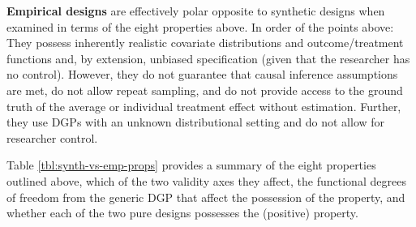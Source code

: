 \documentclass[../main.tex]{subfiles}
\begin{document}
\vspace{\baselineskip}
\textbf{Empirical designs} are effectively polar opposite to synthetic designs when examined in terms of the eight properties above. In order of the points above: They possess inherently realistic covariate distributions and outcome/treatment functions and, by extension, unbiased specification (given that the researcher has no control). However, they do not guarantee that causal inference assumptions are met, do not allow repeat sampling, and do not provide access to the ground truth of the average or individual treatment effect without estimation. Further, they use DGPs with an unknown distributional setting and do not allow for researcher control.\par


\vspace{\baselineskip}
Table \ref{tbl:synth-vs-emp-props} provides a summary of the eight properties outlined above, which of the two validity axes they affect, the functional degrees of freedom from the generic DGP that affect the possession of the property, and whether each of the two pure designs possesses the (positive) property.\par
\end{document}
